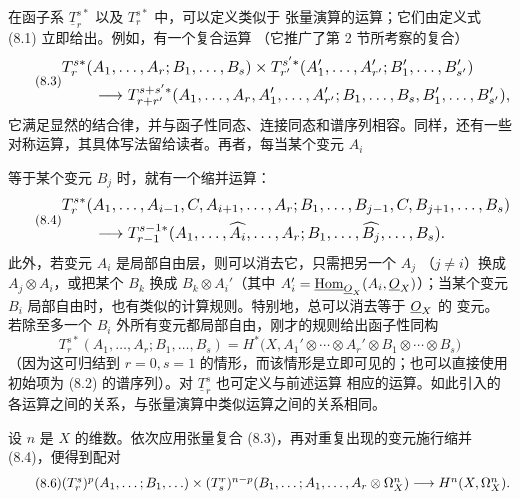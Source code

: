 在函子系 $\underline{T}_{r}^{s*}$ 以及 $T_{r}^{s*}$ 中，可以定义类似于
张量演算的运算；它们由定义式 (8.1) 立即给出。例如，有一个复合运算
（它推广了第 2 节所考察的复合）
\begin{equation}\tag{8.3}
\resizebox{\textwidth}{!}{$
\begin{aligned}
&T_{r}^{s*}(A_1,\ldots,A_r;B_1,\ldots,B_s)
\times T_{r'}^{s'*}(A'_1,\ldots,A'_{r'};B'_1,\ldots,B'_{s'})\\
&\qquad\longrightarrow
T_{r+r'}^{s+s'*}
(A_1,\ldots,A_r,A'_1,\ldots,A'_{r'};
 B_1,\ldots,B_s,B'_1,\ldots,B'_{s'}),
\end{aligned}
$}
\end{equation}
它满足显然的结合律，并与函子性同态、连接同态和谱序列相容。同样，还有一些
对称运算，其具体写法留给读者。再者，每当某个变元 $A_i$

等于某个变元 $B_j$ 时，就有一个缩并运算：
\begin{equation}\tag{8.4}
\resizebox{\textwidth}{!}{$
\begin{aligned}
&T_{r}^{s*}(A_1,\ldots,A_{i-1},C,A_{i+1},\ldots,A_r;
 B_1,\ldots,B_{j-1},C,B_{j+1},\ldots,B_s)\\
&\qquad\longrightarrow
T_{r-1}^{s-1*}(A_1,\ldots,\widehat{A_i},\ldots,A_r;
 B_1,\ldots,\widehat{B_j},\ldots,B_s).
\end{aligned}
$}
\end{equation}
此外，若变元 $A_i$ 是局部自由层，则可以消去它，只需把另一个 $A_j$
（$j\neq i$）换成 $A_j\otimes A_i$，或把某个 $B_k$ 换成
$B_k\otimes A_i'$（其中 $A_i'=\underline{\operatorname{Hom}}_{\underline{O}_X}(A_i,\underline{O}_X)$）；当某个变元
$B_i$ 局部自由时，也有类似的计算规则。特别地，总可以消去等于 $\underline{O}_X$ 的
变元。若除至多一个 $B_i$ 外所有变元都局部自由，刚才的规则给出函子性同构
\begin{equation}\tag{8.5}
  T_{r}^{s*}(A_1,\ldots,A_r;B_1,\ldots,B_s)
  =H^{*}\bigl(X,A_1'\otimes\cdots\otimes A_r'
    \otimes B_1\otimes\cdots\otimes B_s\bigr)
\end{equation}
（因为这可归结到 $r=0,s=1$ 的情形，而该情形是立即可见的；也可以直接使用
初始项为 (8.2) 的谱序列）。对 $\underline{T}_{r}^{s}$ 也可定义与前述运算
相应的运算。如此引入的各运算之间的关系，与张量演算中类似运算之间的关系相同。

设 $n$ 是 $X$ 的维数。依次应用张量复合 (8.3)，再对重复出现的变元施行缩并
(8.4)，便得到配对
\begin{equation}\tag{8.6}
\resizebox{\textwidth}{!}{$
  (T_{r}^{s})^{p}(A_1,\ldots;B_1,\ldots)
  \times
  (T_{s}^{r})^{n-p}(B_1,\ldots;A_1,\ldots,A_r\otimes\Omega_X^{n})
  \longrightarrow H^{n}(X,\Omega_X^{n}).
$}
\end{equation}

